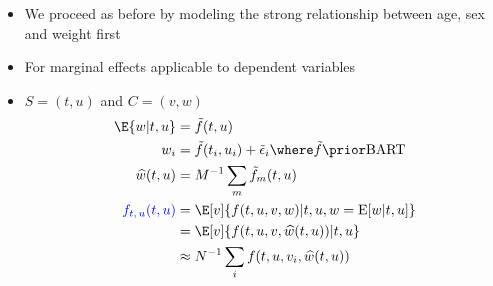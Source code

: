 \documentclass[11pt,dvipsnames,usenames,times]{beamer}
\newcommand*{\BART}{\mathrm{BART}\ }
\newcommand*{\blue}[1]{\textcolor{blue}{#1}}%
\begin{document}
\begin{frame}
\begin{itemize}
\item We proceed as before by modeling
the strong relationship between age, sex and weight first\\
\item For marginal effects applicable to dependent variables
\item $S=(t, u)$ and $C=(v, w)$
\begin{align*}
  \E{w|t, u}& ={\tilde{f}(t, u)} \\
w_i & =\tilde{f}(t_i, u_i)+\tilde{\epsilon}_i \where \tilde{f} \prior \BART \\
\widehat{w}(t, u) & =M^{-1}\sum_m\tilde{f}_m(t, u) \\
\textcolor{blue}{f_{t,\,u}(t, u)}&=\E[v]{f(t, u, v, {w})|t, u, {w}=
\mathrm{E}[w|t, u]} \\%
&=\E[v]{f(t, u, v, \widehat{w}(t, u))|t, u} \\%
&\approx N^{-1}\sum_if(t, u, v_i, \widehat{w}(t, u)) 
\end{align*}
\end{itemize}

\end{frame}
\end{document}
